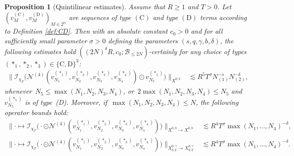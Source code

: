 \documentclass[10pt,a4paper]{amsart}
\newtheorem{proposition}{Proposition}
\newcommand{\N}{\mathbb{N}}
\newcommand{\dotcirc}{\mathbin{\odot}}
\begin{document}
\begin{proposition}[Quintilinear estimates]
	\label{prop:quintilinear}
 Assume that $R\geq 1$ and $T>0$. Let $(v_M^{(\mathrm{C})}, v_M^{(\mathrm{D})})_{M\in 2^{\N}}$ are sequences of type $(\mathrm{C})$ and type $(\mathrm{D})$ terms according to Definition \ref{def:CD}.
Then with an absolute constant $c_0>0$ and for all sufficiently small parameter $\sigma>0$ defining the parameters $(s,q,\gamma,b,\delta)$, the following estimates hold
$((2N)^{\delta}R,c_0;\mathcal{B}_{\leq2N})$-certainly for any choice of types~$(\ast_1,\ast_2,\ast_3)\in\{\mathrm{C},\mathrm{D}\}^3$:
	\begin{align*}
		\big\|\mathcal{I}_{\chi_T}\big(
		\mathcal{N}^{(4)}(v_{N_1}^{(\ast_1)},v_{N_2}^{(\ast_2)},v_{N_3}^{(\ast_3)},v_{N_4}^{(\ast_4)})
		\dotcirc v_{N_5}^{(\ast_5)}
		\big)\big\|_{X^{0,b}}
		&\lesssim R^5T^{\sigma}N_{(1)}^{-s}N_{(2)}^{-\delta},
	\end{align*}
	whenever~$N_5\leq \max(N_1,N_2,N_3,N_4)$, or~$2\max(N_1,N_2,N_3,N_4)\leq N_5$ and~$v_{N_5}^{(\ast_5)}$ is of type~(D).
	Moreover, if~$\max(N_1,N_2,N_3,N_4)\leq N$, the following operator bounds hold:
	\begin{align*}
		\big\|\cdot\mapsto
		\mathcal{I}_{\chi_T}\big(
		\cdot\dotcirc\mathcal{N}^{(4)}(v_{N_1}^{(\ast_1)},v_{N_2}^{(\ast_2)},v_{N_3}^{(\ast_3)},v_{N_4}^{(\ast_4)})
		\big)\big\|_{X^{0,b}\to X^{0,b}}
		&\lesssim R^4T^{\sigma}\max(N_1,\dots,N_4)^{-\delta},\\
		\big\|\cdot\mapsto
		\mathcal{I}_{\chi_T}\big(
		\cdot\dotcirc\mathcal{N}^{(4)}(v_{N_1}^{(\ast_1)},v_{N_2}^{(\ast_2)},v_{N_3}^{(\ast_3)},v_{N_4}^{(\ast_4)})
		\big)\big\|_{X_{q,q}^{0,\gamma}\to X_{q,q}^{0,\gamma}}
		&\lesssim R^4T^{\sigma}\max(N_1,\dots,N_4)^{-\delta}.
	\end{align*}
\end{proposition}
\end{document}
